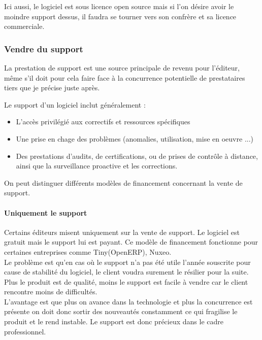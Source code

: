 					Ici aussi, le logiciel est sous licence open source mais si l'on désire avoir le moindre support dessus, il faudra se tourner vers son confrère et sa licence commerciale.

			\subsubsection{Vendre du support}

				La prestation de support est une source principale de revenu pour l'éditeur, même s'il doit pour cela faire face à la concurrence potentielle de prestataires tiers que je précise juste après.

				Le support d'un logiciel inclut généralement :

				\begin{itemize}[label=\textbullet, font=\LARGE \color{burntorange}]
					\item L'accès privilégié aux correctifs et ressources spécifiques
					\item Une prise en chage des problèmes (anomalies, utilisation, mise en oeuvre ...)
					\item Des prestations d'audits, de certifications, ou de prises de contrôle à distance, ainsi que la surveillance proactive et les corrections.
				\end{itemize}

				On peut distinguer différents modèles de financement concernant la vente de support.

				\paragraph{Uniquement le support\\}

					Certains éditeurs misent uniquement sur la vente de support. Le logiciel est gratuit mais le support lui est payant. Ce modèle de financement fonctionne pour certaines entreprises comme Tiny(OpenERP), Nuxeo.\\

					Le problème est qu'en cas où le support n'a pas été utile l'année souscrite pour cause de stabilité du logiciel, le client voudra surement le résilier pour la suite.\\

					Plus le produit est de qualité, moins le support est facile à vendre car le client rencontre moins de difficultés.\\

					L'avantage est que plus on avance dans la technologie et plus la concurrence est présente on doit donc sortir des nouveautés constamment ce qui fragilise le produit et le rend instable. Le support est donc précieux dans le cadre professionnel.

